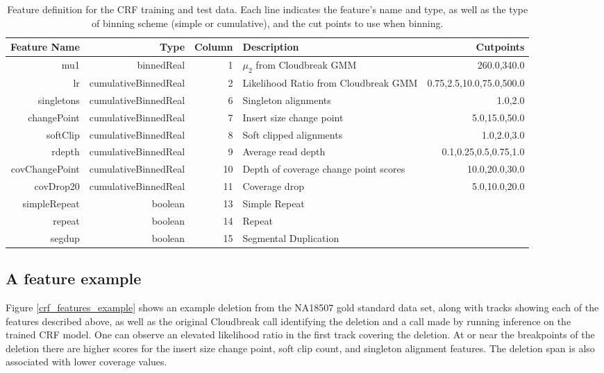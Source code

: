 \begin{table}
\begin{center}
\footnotesize
\begin{tabular}{rrrp{3.5cm}r}
 \hline
Feature Name & Type & Column & Description & Cutpoints \\
 \hline
 mu1 & binnedReal & 1 & $\mu_2$ from Cloudbreak GMM  &  260.0,340.0 \\
 lr &  cumulativeBinnedReal  &  2   & Likelihood Ratio from Cloudbreak GMM &  0.75,2.5,10.0,75.0,500.0 \\
 singletons & cumulativeBinnedReal &  6  & Singleton alignments  &  1.0,2.0 \\
 changePoint & cumulativeBinnedReal & 7 & Insert size change point & 5.0,15.0,50.0 \\
 softClip & cumulativeBinnedReal & 8 & Soft clipped alignments &  1.0,2.0,3.0 \\
 rdepth & cumulativeBinnedReal & 9 & Average read depth & 0.1,0.25,0.5,0.75,1.0 \\
 covChangePoint & cumulativeBinnedReal &  10 & Depth of coverage change point scores &  10.0,20.0,30.0 \\
 covDrop20 &  cumulativeBinnedReal  &  11 & Coverage drop &  5.0,10.0,20.0 \\
 simpleRepeat & boolean &  13  & Simple Repeat & \\
 repeat & boolean &  14  & Repeat & \\
 segdup & boolean &  15  &  Segmental Duplication & \\
 \hline
\end{tabular}
\end{center}
\caption{Feature definition for the CRF training and test data. Each line indicates the feature's name and type, as well as the type of binning scheme (simple or cumulative), and the cut points to use when binning.}
\label{crf_feature_definitions}
\end{table}

\subsection{A feature example}

Figure \ref{crf_features_example} shows an example deletion from the NA18507 gold standard data set, along with tracks showing each of the features described above, as well as the original Cloudbreak call identifying the deletion and a call made by running inference on the trained CRF model. One can observe an elevated likelihood ratio in the first track covering the deletion. At or near the breakpoints of the deletion there are higher scores for the insert size change point, soft clip count, and singleton alignment features. The deletion span is also associated with lower coverage values.

